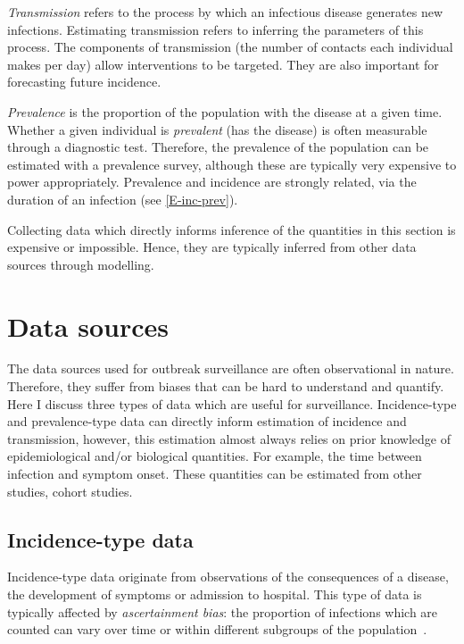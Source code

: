 \documentclass[thesis.tex]{subfiles}
\begin{document}
\emph{Transmission} refers to the process by which an infectious disease generates new infections.
Estimating transmission refers to inferring the parameters of this process.
The components of transmission (\eg the number of contacts each individual makes per day) allow interventions to be targeted.
They are also important for forecasting future incidence.

\emph{Prevalence} is the proportion of the population with the disease at a given time.
Whether a given individual is \emph{prevalent} (has the disease) is often measurable through a diagnostic test.
Therefore, the prevalence of the population can be estimated with a prevalence survey, although these are typically very expensive to power appropriately.
Prevalence and incidence are strongly related, via the duration of an infection (see \cref{E-inc-prev}).


Collecting data which directly informs inference of the quantities in this section is expensive or impossible.
Hence, they are typically inferred from other data sources through modelling.


\section{Data sources}

The data sources used for outbreak surveillance are often observational in nature.
Therefore, they suffer from biases that can be hard to understand and quantify.
Here I discuss three types of data which are useful for surveillance.
Incidence-type and prevalence-type data can directly inform estimation of incidence and transmission, however, this estimation almost always relies on prior knowledge of epidemiological and/or biological quantities.
For example, the time between infection and symptom onset.
These quantities can be estimated from other studies, \eg cohort studies.

\subsection{Incidence-type data}

Incidence-type data originate from observations of the consequences of a disease, \eg the development of symptoms or admission to hospital.
This type of data is typically affected by \emph{ascertainment bias}: the proportion of infections which are counted can vary over time or within different subgroups of the population~\autocite[chapter 9]{lashModern}.
\end{document}
